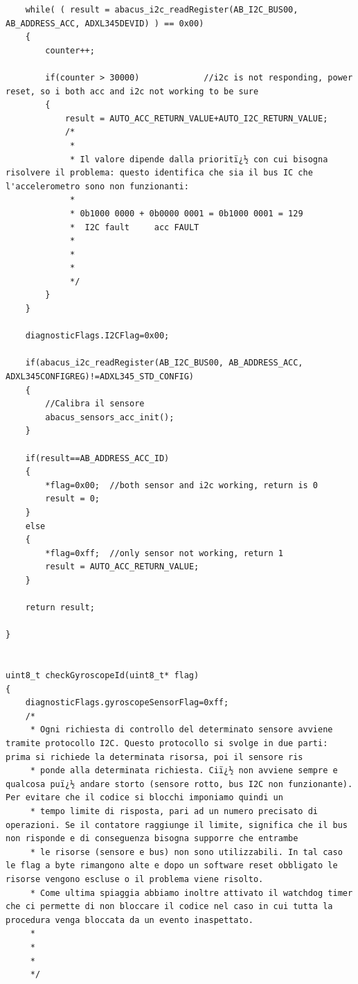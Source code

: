 \documentclass[LaM,binding=0.6cm,oneside]{../sapthesis}
\begin{document}
\begin{lstlisting}
    while( ( result = abacus_i2c_readRegister(AB_I2C_BUS00, AB_ADDRESS_ACC, ADXL345DEVID) ) == 0x00)
    {
        counter++;

        if(counter > 30000)             //i2c is not responding, power reset, so i both acc and i2c not working to be sure
        {
            result = AUTO_ACC_RETURN_VALUE+AUTO_I2C_RETURN_VALUE;
            /*
             *
             * Il valore dipende dalla prioritï¿½ con cui bisogna risolvere il problema: questo identifica che sia il bus IC che l'accelerometro sono non funzionanti:
             *
             * 0b1000 0000 + 0b0000 0001 = 0b1000 0001 = 129
             *  I2C fault     acc FAULT
             *
             *
             *
             */
        }
    }

    diagnosticFlags.I2CFlag=0x00;

    if(abacus_i2c_readRegister(AB_I2C_BUS00, AB_ADDRESS_ACC, ADXL345CONFIGREG)!=ADXL345_STD_CONFIG)
    {
        //Calibra il sensore
        abacus_sensors_acc_init();
    }

    if(result==AB_ADDRESS_ACC_ID)
    {
        *flag=0x00;  //both sensor and i2c working, return is 0
        result = 0;
    }
    else
    {
        *flag=0xff;  //only sensor not working, return 1
        result = AUTO_ACC_RETURN_VALUE;
    }

    return result;

}


uint8_t checkGyroscopeId(uint8_t* flag)
{
    diagnosticFlags.gyroscopeSensorFlag=0xff;
    /*
     * Ogni richiesta di controllo del determinato sensore avviene tramite protocollo I2C. Questo protocollo si svolge in due parti: prima si richiede la determinata risorsa, poi il sensore ris
     * ponde alla determinata richiesta. Ciï¿½ non avviene sempre e qualcosa puï¿½ andare storto (sensore rotto, bus I2C non funzionante). Per evitare che il codice si blocchi imponiamo quindi un
     * tempo limite di risposta, pari ad un numero precisato di operazioni. Se il contatore raggiunge il limite, significa che il bus non risponde e di conseguenza bisogna supporre che entrambe
     * le risorse (sensore e bus) non sono utilizzabili. In tal caso le flag a byte rimangono alte e dopo un software reset obbligato le risorse vengono escluse o il problema viene risolto.
     * Come ultima spiaggia abbiamo inoltre attivato il watchdog timer che ci permette di non bloccare il codice nel caso in cui tutta la procedura venga bloccata da un evento inaspettato.
     *
     *
     *
     */



\end{lstlisting}
\end{document}
